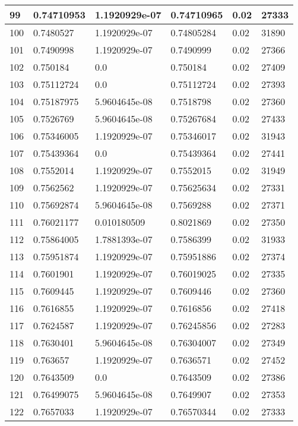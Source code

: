 \begin{longtable}{|l|l|l|l|l|l|}
99 & 0.74710953 & 1.1920929e-07 & 0.74710965 & 0.02 & 27333 \\ \hline 
100 & 0.7480527 & 1.1920929e-07 & 0.74805284 & 0.02 & 31890 \\ \hline 
101 & 0.7490998 & 1.1920929e-07 & 0.7490999 & 0.02 & 27366 \\ \hline 
102 & 0.750184 & 0.0 & 0.750184 & 0.02 & 27409 \\ \hline 
103 & 0.75112724 & 0.0 & 0.75112724 & 0.02 & 27393 \\ \hline 
104 & 0.75187975 & 5.9604645e-08 & 0.7518798 & 0.02 & 27360 \\ \hline 
105 & 0.7526769 & 5.9604645e-08 & 0.75267684 & 0.02 & 27433 \\ \hline 
106 & 0.75346005 & 1.1920929e-07 & 0.75346017 & 0.02 & 31943 \\ \hline 
107 & 0.75439364 & 0.0 & 0.75439364 & 0.02 & 27441 \\ \hline 
108 & 0.7552014 & 1.1920929e-07 & 0.7552015 & 0.02 & 31949 \\ \hline 
109 & 0.7562562 & 1.1920929e-07 & 0.75625634 & 0.02 & 27331 \\ \hline 
110 & 0.75692874 & 5.9604645e-08 & 0.7569288 & 0.02 & 27371 \\ \hline 
111 & 0.76021177 & 0.010180509 & 0.8021869 & 0.02 & 27350 \\ \hline 
112 & 0.75864005 & 1.7881393e-07 & 0.7586399 & 0.02 & 31933 \\ \hline 
113 & 0.75951874 & 1.1920929e-07 & 0.75951886 & 0.02 & 27374 \\ \hline 
114 & 0.7601901 & 1.1920929e-07 & 0.76019025 & 0.02 & 27335 \\ \hline 
115 & 0.7609445 & 1.1920929e-07 & 0.7609446 & 0.02 & 27360 \\ \hline 
116 & 0.7616855 & 1.1920929e-07 & 0.7616856 & 0.02 & 27418 \\ \hline 
117 & 0.7624587 & 1.1920929e-07 & 0.76245856 & 0.02 & 27283 \\ \hline 
118 & 0.7630401 & 5.9604645e-08 & 0.76304007 & 0.02 & 27349 \\ \hline 
119 & 0.763657 & 1.1920929e-07 & 0.7636571 & 0.02 & 27452 \\ \hline 
120 & 0.7643509 & 0.0 & 0.7643509 & 0.02 & 27386 \\ \hline 
121 & 0.76499075 & 5.9604645e-08 & 0.7649907 & 0.02 & 27353 \\ \hline 
122 & 0.7657033 & 1.1920929e-07 & 0.76570344 & 0.02 & 27333 \\ \hline 

\end{longtable}
